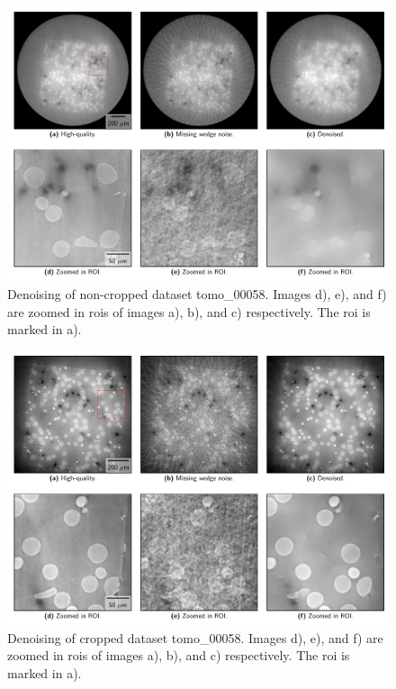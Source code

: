 \begin{figure}[htbp]
  \centering
  \includegraphics[width=.9\textwidth]{figures/uncroppeddenoising.pdf}
  \caption[Non-cropped image denoising]{Denoising of non-cropped dataset tomo\_00058. Images d), e), and f) are zoomed in \acrshort{roi}s of images a), b), and c) respectively. The \acrshort{roi} is marked in a). }
  \label{fig:uncroppeddenoising}
\end{figure}

\begin{figure}[htbp]
  \centering
  \includegraphics[width=.9\textwidth]{figures/croppeddenoising.pdf}
  \caption[Cropped image denoising]{Denoising of cropped dataset tomo\_00058. Images d), e), and f) are zoomed in \acrshort{roi}s of images a), b), and c) respectively. The \acrshort{roi} is marked in a). }
  \label{fig:croppeddenoising}
\end{figure}

